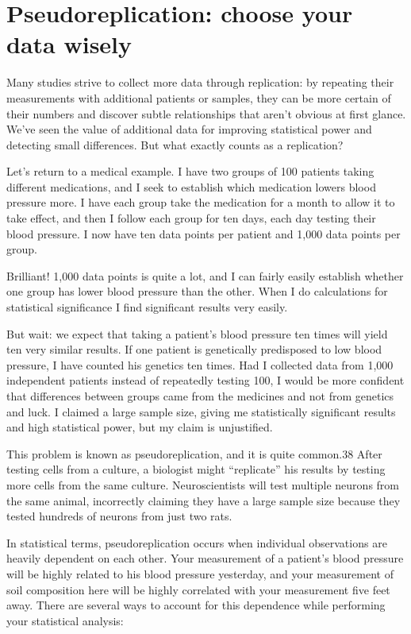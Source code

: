 \chapter{Pseudoreplication: choose your data wisely}
\label{chp4}


Many studies strive to collect more data through replication: by repeating their measurements with additional patients or samples, they can be more certain of their numbers and discover subtle relationships that aren’t obvious at first glance. We’ve seen the value of additional data for improving statistical power and detecting small differences. But what exactly counts as a replication?

Let’s return to a medical example. I have two groups of 100 patients taking different medications, and I seek to establish which medication lowers blood pressure more. I have each group take the medication for a month to allow it to take effect, and then I follow each group for ten days, each day testing their blood pressure. I now have ten data points per patient and 1,000 data points per group.

Brilliant! 1,000 data points is quite a lot, and I can fairly easily establish whether one group has lower blood pressure than the other. When I do calculations for statistical significance I find significant results very easily.

But wait: we expect that taking a patient’s blood pressure ten times will yield ten very similar results. If one patient is genetically predisposed to low blood pressure, I have counted his genetics ten times. Had I collected data from 1,000 independent patients instead of repeatedly testing 100, I would be more confident that differences between groups came from the medicines and not from genetics and luck. I claimed a large sample size, giving me statistically significant results and high statistical power, but my claim is unjustified.

This problem is known as pseudoreplication, and it is quite common.38 After testing cells from a culture, a biologist might “replicate” his results by testing more cells from the same culture. Neuroscientists will test multiple neurons from the same animal, incorrectly claiming they have a large sample size because they tested hundreds of neurons from just two rats.

In statistical terms, pseudoreplication occurs when individual observations are heavily dependent on each other. Your measurement of a patient’s blood pressure will be highly related to his blood pressure yesterday, and your measurement of soil composition here will be highly correlated with your measurement five feet away. There are several ways to account for this dependence while performing your statistical analysis:

